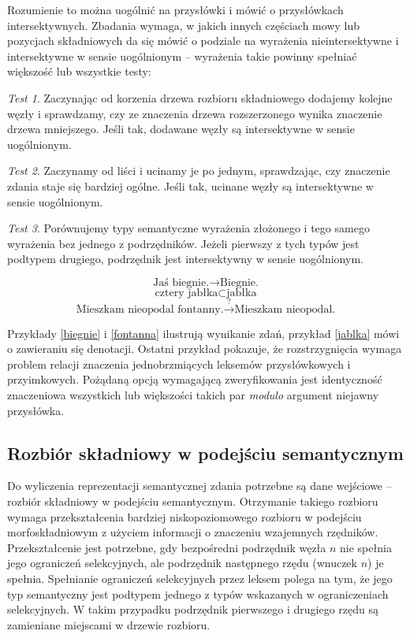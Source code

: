 \documentclass[a4paper, 12pt]{article}
\theoremstyle{remark}
\newtheorem{test}{Test}
\begin{document}
Rozumienie to można uogólnić na przysłówki i mówić o przysłówkach intersektywnych. Zbadania wymaga, w jakich innych częściach mowy lub pozycjach składniowych da się mówić o podziale na wyrażenia nieintersektywne i intersektywne w sensie uogólnionym -- wyrażenia takie powinny spełniać większość lub wszystkie testy:
\begin{test}
Zaczynając od korzenia drzewa rozbioru składniowego dodajemy kolejne węzły i sprawdzamy, czy ze znaczenia drzewa rozszerzonego wynika znaczenie drzewa mniejszego. Jeśli tak, dodawane węzły są intersektywne w sensie uogólnionym.
\end{test}
\begin{test}
Zaczynamy od liści i ucinamy je po jednym, sprawdzając, czy znaczenie zdania staje się bardziej ogólne. Jeśli tak, ucinane węzły są intersektywne w sensie uogólnionym.
\end{test}
\begin{test}
Porównujemy typy semantyczne wyrażenia złożonego i tego samego wyrażenia bez jednego z podrzędników. Jeżeli pierwszy z tych typów jest podtypem drugiego, podrzędnik jest intersektywny w sensie uogólnionym.
\end{test}
\begin{equation}\label{biegnie}
	\text{Jaś biegnie.} \rightarrow \text{Biegnie.}
\end{equation}
\begin{equation}\label{jablka}
	\text{cztery jabłka} \subset \text{jabłka}
\end{equation}
\begin{equation}\label{fontanna}
\text{Mieszkam nieopodal fontanny.} \stackrel{?}{\rightarrow} \text{Mieszkam nieopodal.}
\end{equation}

Przykłady \ref{biegnie} i \ref{fontanna} ilustrują wynikanie zdań, przykład \ref{jablka} mówi o zawieraniu się denotacji.
Ostatni przykład pokazuje, że rozstrzygnięcia wymaga problem relacji znaczenia jednobrzmiących leksemów przysłówkowych i przyimkowych. Pożądaną opcją wymagającą zweryfikowania jest identyczność znaczeniowa wszystkich lub większości takich par \emph{modulo} argument niejawny przysłówka.

\subsection{Rozbiór składniowy w podejściu semantycznym}

Do wyliczenia reprezentacji semantycznej zdania potrzebne są dane wejściowe -- rozbiór składniowy w podejściu semantycznym. Otrzymanie takiego rozbioru wymaga przekształcenia bardziej niskopoziomowego rozbioru w podejściu morfoskładniowym z użyciem informacji o znaczeniu wzajemnych rzędników. Przekształcenie jest potrzebne, gdy bezpośredni podrzędnik węzła $n$ nie spełnia jego ograniczeń selekcyjnych, ale podrzędnik następnego rzędu (wnuczek $n$) je spełnia. Spełnianie ograniczeń selekcyjnych przez leksem polega na tym, że jego typ semantyczny jest podtypem jednego z typów wskazanych w ograniczeniach selekcyjnych. W takim przypadku podrzędnik pierwszego i drugiego rzędu są zamieniane miejscami w drzewie rozbioru.
\end{document}
